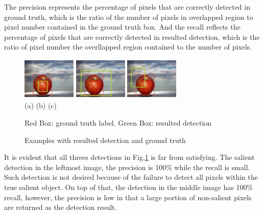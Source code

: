 \documentclass[10pt,twocolumn,letterpaper]{article}
\newcommand{\hs}{\hspace{0.58in}}
\begin{document}
The precision represents the percentage of pixels that are correctly detected in ground truth, which 
is the ratio of the number of pixels in overlapped region to pixel number contained in the ground truth box.
And the recall reflects the percentage of pixels that are correctly detected in resulted detection, 
which is the ratio of pixel number the overllapped region contained to the number of pixels.

\begin{figure}[h]
\begin{center}
    \includegraphics[width=1.0in,height=0.8in]{Figures/Creteria/B.jpg}
    \includegraphics[width=1.0in,height=0.8in]{Figures/Creteria/C.jpg} 
    \includegraphics[width=1.0in,height=0.8in]{Figures/Creteria/A.jpg} \\
    \footnotesize (a) \hs \hspace*{0.8cm} (b)  \hs \hspace*{0.8cm} (c)
    \caption{Examples with resulted detection and ground truth} \label{Fig:PrecisionANDRecall}
    \footnotesize Red Box: ground truth label. Green Box: resulted detection
\end{center} \end{figure}

It is evident that all threes detections in Fig.\ref{Fig:PrecisionANDRecall} is far from satisfying. 
The salient detection in the leftmost image, the precision is 100\% while the recall is small.
Such detection is not desired because of the failure to detect all pixels within the true salient object.
On top of that, the detection in the middle image has 100\% recall, however, 
the precision is low in that a large portion of non-salient pixels are returned as the detection result.
\end{document}

